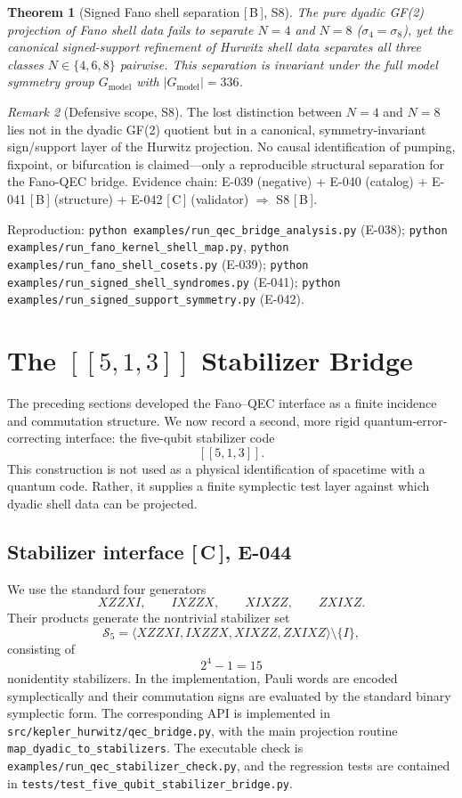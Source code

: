 \documentclass[11pt, lettersize, article]{article}
\newtheorem{theorem}{Theorem}
\theoremstyle{definition}
\theoremstyle{remark}
\newtheorem{remark}[theorem]{Remark}
\newcommand{\evidence}[1]{\textnormal{[\,#1\,]}}
\begin{document}
\begin{theorem}[Signed Fano shell separation \evidence{B}, S8]
\label{thm:s8}
The pure dyadic GF(2) projection of Fano shell data fails to separate $N=4$ and $N=8$ ($\sigma_4=\sigma_8$), yet the canonical signed-support refinement of Hurwitz shell data separates all three classes $N\in\{4,6,8\}$ pairwise.
This separation is invariant under the full model symmetry group $G_{\mathrm{model}}$ with $|G_{\mathrm{model}}|=336$.
\end{theorem}

\begin{remark}[Defensive scope, S8]
The lost distinction between $N=4$ and $N=8$ lies not in the dyadic GF(2) quotient but in a canonical, symmetry-invariant sign/support layer of the Hurwitz projection.
No causal identification of pumping, fixpoint, or bifurcation is claimed---only a reproducible structural separation for the Fano-QEC bridge.
Evidence chain: E-039 (negative) + E-040 (catalog) + E-041 \evidence{B} (structure) + E-042 \evidence{C} (validator) $\Rightarrow$ S8 \evidence{B}.
\end{remark}

Reproduction:
\texttt{python examples/run\_qec\_bridge\_analysis.py} (E-038);
\texttt{python examples/run\_fano\_kernel\_shell\_map.py},
\texttt{python examples/run\_fano\_shell\_cosets.py} (E-039);
\texttt{python examples/run\_signed\_shell\_syndromes.py} (E-041);
\texttt{python examples/run\_signed\_support\_symmetry.py} (E-042).

\section{The \texorpdfstring{$[[5,1,3]]$}{[[5,1,3]]} Stabilizer Bridge}
\label{sec:qec-stabilizer-bridge}

The preceding sections developed the Fano--QEC interface as a finite
incidence and commutation structure.  We now record a second, more rigid
quantum-error-correcting interface: the five-qubit stabilizer code
\[
[[5,1,3]].
\]
This construction is not used as a physical identification of spacetime
with a quantum code.  Rather, it supplies a finite symplectic test layer
against which dyadic shell data can be projected.

\subsection{Stabilizer interface \evidence{C}, E-044}

We use the standard four generators
\[
XZZXI,\qquad
IXZZX,\qquad
XIXZZ,\qquad
ZXIXZ.
\]
Their products generate the nontrivial stabilizer set
\[
\mathcal S_{5}
=
\langle XZZXI,IXZZX,XIXZZ,ZXIXZ\rangle\setminus\{I\},
\]
consisting of
\[
2^4-1=15
\]
nonidentity stabilizers.  In the implementation, Pauli words are encoded
symplectically and their commutation signs are evaluated by the standard
binary symplectic form.
The corresponding API is implemented in
\texttt{src/kepler\_hurwitz/qec\_bridge.py},
with the main projection routine
\texttt{map\_dyadic\_to\_stabilizers}.
The executable check is
\texttt{examples/run\_qec\_stabilizer\_check.py},
and the regression tests are contained in
\texttt{tests/test\_five\_qubit\_stabilizer\_bridge.py}.
\end{document}
